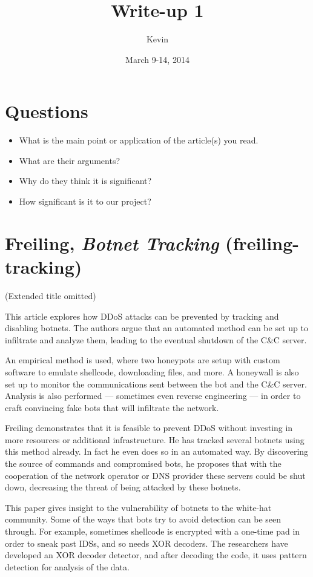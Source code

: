 \documentclass{article}
\title{Write-up 1}
\author{Kevin}
\date{March 9-14, 2014}
\begin{document}
	\maketitle

\section{Questions}
	\begin{itemize}
		\item What is the main point or application of the article(s) you read.
		\item What are their arguments?
		\item Why do they think it is significant?
		\item How significant is it to our project?
	\end{itemize}	
	
	\section{Freiling, \emph{Botnet Tracking} (\textbf{freiling-tracking})}
		(Extended title omitted)\cite{freiling-tracking}
		
		This article explores how DDoS attacks can be prevented by tracking and disabling botnets. The authors argue that an automated method can be set up to infiltrate and analyze them, leading to the eventual shutdown of the C\&C server. 
		
		An empirical method is used, where two honeypots are setup with custom software to emulate shellcode, downloading files, and more. A honeywall is also set up to monitor the communications sent between the bot and the C\&C server. Analysis is also performed --- sometimes even reverse engineering --- in order to craft convincing fake bots that will infiltrate the network. 
		
		
		Freiling demonstrates that it is feasible to prevent DDoS without investing in more resources or additional infrastructure. He has tracked several botnets using this method already. In fact he even does so in an automated way. By discovering the source of commands and compromised bots, he proposes that with the cooperation of the network operator or DNS provider these servers could be shut down, decreasing the threat of being attacked by these botnets.
		
		
		This paper gives insight to the vulnerability of botnets to the white-hat community. Some of the ways that bots try to avoid detection can be seen through. For example, sometimes shellcode is encrypted with a one-time pad in order to sneak past IDSs, and so needs XOR decoders. The researchers have developed an XOR decoder detector, and after decoding the code, it uses pattern detection for analysis of the data.
		
\end{document}
